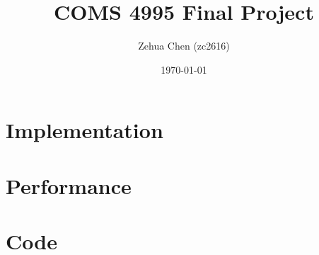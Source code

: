 \documentclass{article}
\title{COMS 4995 Final Project}
\author{Zehua Chen (zc2616)}
\date{\today}
\begin{document}
  \maketitle
  \tableofcontents

  \setlength{\parskip}{8px}
  \setlength{\parindent}{0px}

  \section{Implementation}
  \section{Performance}
  \section{Code}
\end{document}

